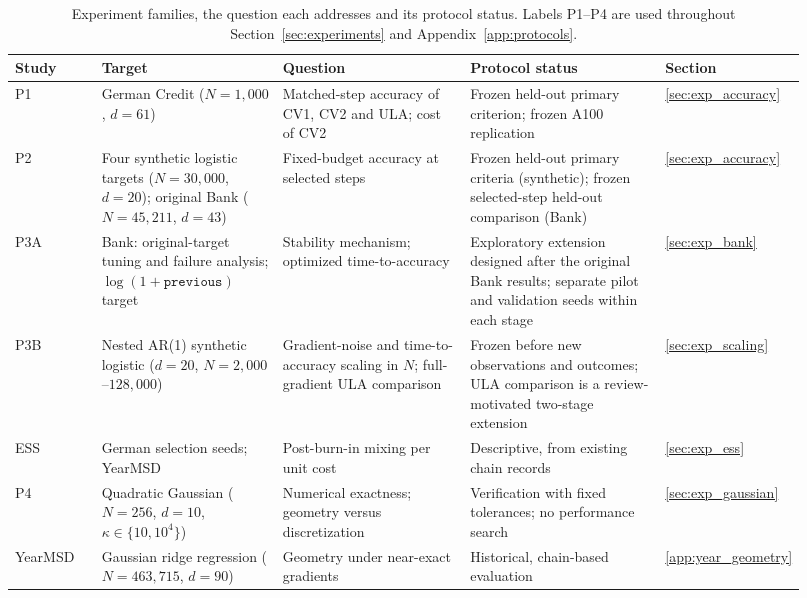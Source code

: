 \begin{table}[tb]
\centering\footnotesize
\caption{Experiment families, the question each addresses and its protocol status. Labels P1--P4 are used throughout Section~\ref{sec:experiments} and Appendix~\ref{app:protocols}.}\label{tab:exp_overview}
\setlength{\tabcolsep}{3pt}
\begin{tabular}{@{}>{\raggedright\arraybackslash}p{0.11\linewidth}>{\raggedright\arraybackslash}p{0.23\linewidth}>{\raggedright\arraybackslash}p{0.24\linewidth}>{\raggedright\arraybackslash}p{0.25\linewidth}>{\raggedright\arraybackslash}p{0.09\linewidth}@{}}
\toprule
Study & Target & Question & Protocol status & Section \\
\midrule
P1 & German Credit ($N=1{,}000$, $d=61$) & Matched-step accuracy of CV1, CV2 and ULA; cost of CV2 & Frozen held-out primary criterion; frozen A100 replication & \ref{sec:exp_accuracy} \\
\addlinespace[5pt]
P2 & Four synthetic logistic targets ($N=30{,}000$, $d=20$); original Bank ($N=45{,}211$, $d=43$) & Fixed-budget accuracy at selected steps & Frozen held-out primary criteria (synthetic); frozen selected-step held-out comparison (Bank) & \ref{sec:exp_accuracy} \\
\addlinespace[5pt]
P3A & Bank: original-target tuning and failure analysis; $\log(1+\texttt{previous})$ target & Stability mechanism; optimized time-to-accuracy & Exploratory extension designed after the original Bank results; separate pilot and validation seeds within each stage & \ref{sec:exp_bank} \\
\addlinespace[5pt]
P3B & Nested AR(1) synthetic logistic ($d=20$, $N=2{,}000$--$128{,}000$) & Gradient-noise and time-to-accuracy scaling in $N$; full-gradient ULA comparison & Frozen before new observations and outcomes; ULA comparison is a review-motivated two-stage extension & \ref{sec:exp_scaling} \\
\addlinespace[5pt]
ESS & German selection seeds; YearMSD & Post-burn-in mixing per unit cost & Descriptive, from existing chain records & \ref{sec:exp_ess} \\
\addlinespace[5pt]
P4 & Quadratic Gaussian ($N=256$, $d=10$, $\kappa\in\{10,10^4\}$) & Numerical exactness; geometry versus discretization & Verification with fixed tolerances; no performance search & \ref{sec:exp_gaussian} \\
\addlinespace[5pt]
YearMSD & Gaussian ridge regression ($N=463{,}715$, $d=90$) & Geometry under near-exact gradients & Historical, chain-based evaluation & \ref{app:year_geometry} \\
\bottomrule
\end{tabular}
\end{table}
